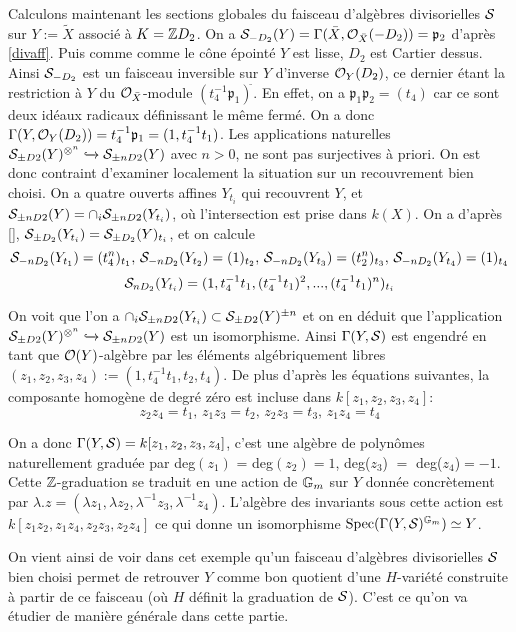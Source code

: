 Calculons maintenant les sections globales du faisceau d'algèbres divisorielles $\mathcal{S}$ sur $Y:=\widetilde{X}$ associé à $K=\mathbb{Z} D_2$. On a $\mathcal{S}_{-D_2}(Y)=\Gamma(\bar{X}, \mathcal{O}_{\bar{X}}(-D_2))=\mathfrak{p}_2$ d'après \ref{divaff}. Puis comme comme le cône épointé $Y$ est lisse, $D_2$ est Cartier dessus. Ainsi $\mathcal{S}_{-D_2}$ est un faisceau inversible sur $Y$ d'inverse $\mathcal{O}_Y(D_2)$, ce dernier étant la restriction à $Y$ du $\mathcal{O}_{\bar{X}}$-module $(t_4^{-1}\mathfrak{p}_1)^{\widetilde{}}$. En effet, on a $\mathfrak{p}_1\mathfrak{p}_2=(t_4)$ car ce sont deux idéaux radicaux définissant le même fermé.  On a donc $\Gamma(Y, \mathcal{O}_Y(D_2))=t_4^{-1}\mathfrak{p}_1=(1, t_4^{-1}t_1)$. Les applications naturelles $\mathcal{S}_{\pm D2}(Y)^{\otimes ^n}\xhookrightarrow{} \mathcal{S}_{\pm nD2}(Y)$ avec $n>0$, ne sont pas surjectives à priori. On est donc contraint d'examiner localement la situation sur un recouvrement bien choisi. On a quatre ouverts affines $Y_{t_i}$ qui recouvrent $Y$, et $\mathcal{S}_{\pm nD2}(Y)=\cap_i \mathcal{S}_{\pm nD2}(Y_{t_i})$, où l'intersection est prise dans $k(X)$. On a d'après \ref{}, $\mathcal{S}_{\pm D_2}(Y_{t_i})=\mathcal{S}_{\pm D_2}(Y)_{t_i}$, et on calcule 
$$\mathcal{S}_{-nD_2}(Y_{t_1})=(t_4^n)_{t_1},\,\mathcal{S}_{-nD_2}(Y_{t_2})=(1)_{t_2},\,\mathcal{S}_{-nD_2}(Y_{t_3})=(t_2^n)_{t_3},\,\mathcal{S}_{-nD_2}(Y_{t_4})=(1)_{t_4}$$
$$\mathcal{S}_{nD_2}(Y_{t_i})=(1,t_4^{-1}t_1,(t_4^{-1}t_1)^2,...,(t_4^{-1}t_1)^n)_{t_i}$$

On voit que l'on a $\cap_i \mathcal{S}_{\pm nD2}(Y_{t_i})\subset \mathcal{S}_{\pm D2}(Y)^{\pm n}$ et on en déduit que l'application $\mathcal{S}_{\pm D2}(Y)^{\otimes ^n}\xhookrightarrow{} \mathcal{S}_{\pm nD2}(Y)$ est un isomorphisme. Ainsi $\Gamma(Y,\mathcal{S})$ est engendré en tant que $\mathcal{O}(Y)$-algèbre par les éléments algébriquement libres $(z_1,z_2,z_3,z_4):=(1, t_4^{-1}t_1,t_2,t_4)$. De plus d'après les équations suivantes, la composante homogène de degré zéro est incluse dans $k[z_1,z_2,z_3,z_4]$:
$$ z_2z_4=t_1,\, z_1z_3=t_2,\, z_2z_3=t_3,\, z_1z_4=t_4$$

On a donc $\Gamma(Y, \mathcal{S})=k[z_1,z_2,z_3,z_4]$, c'est une algèbre de polynômes naturellement graduée par deg$(z_1)$ = deg$(z_2)=1$, deg($z_3$) $=$ deg($z_4$)$=-1$. Cette $\mathbb{Z}$-graduation se traduit en une action de $\mathbb{G}_m$ sur $Y$ donnée  concrètement par $\lambda.z=(\lambda z_1,\lambda z_2,\lambda^{-1} z_3,\lambda^{-1} z_4)$. L'algèbre des invariants sous cette action est $k[z_1z_2,z_1z_4,z_2z_3,z_2z_4]$ ce qui donne un isomorphisme $\operatorname{Spec}(\Gamma(Y,\mathcal{S})^{\mathbb{G}_m})\simeq Y$.

On vient ainsi de voir dans cet exemple qu'un faisceau d'algèbres divisorielles $\mathcal{S}$ bien choisi permet de retrouver $Y$ comme bon quotient d'une $H$-variété construite à partir de ce faisceau (où $H$ définit la graduation de $\mathcal{S}$). C'est ce qu'on va étudier de manière générale dans cette partie.

